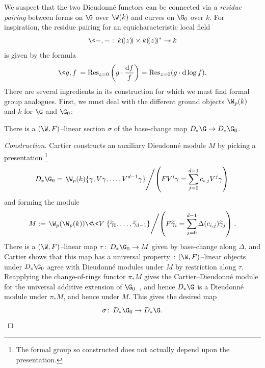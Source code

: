We suspect that the two Dieudonn\'e functors can be connected via a \textit{residue pairing} between forms on \(\G\) over \(\W(k)\) and curves on \(\G_0\) over \(k\).
For inspiration, the residue pairing for an equicharacteristic local field \[\<-,-\>\co k(\!(z)\!) \times k(\!(z)\!)^* \to k\] is given by the formula \[\<g, f\> = \operatorname{Res}_{z=0}\left(g \cdot \frac{\mathrm df}{f}\right) = \operatorname{Res}_{z=0}(g \cdot \mathrm d\log f).\]
There are several ingredients in its construction for which we must find formal group analogues.
First, we must deal with the different ground objects \(\W_p(k)\) and \(k\) for \(\G\) and \(\G_0\):
\begin{lemma}
There is a \((\W, F)\)--linear section \(\sigma\) of the base-change map \(D_* \G \to D_* \G_0\).
\end{lemma}
\begin{proof}[Construction]
Cartier constructs an auxiliary Dieudonn\'e module \(M\) by picking a presentation%
\footnote{%
The formal group so constructed does not actually depend upon the presentation.
}
\[D_* \G_0 = \left.\W_p(k)\{\gamma, V\gamma, \ldots, V^{d-1} \gamma\} \middle/ \left(F V^i \gamma = \sum_{j=0}^{d-1} c_{i,j} V^j \gamma\right) \right.\] and forming the module \[M := \left.\W_p(\W_p(k))\<\!\<V\>\!\>\{\widetilde\gamma_0, \ldots, \widetilde\gamma_{d-1}\} \middle/ \left(F \widetilde \gamma_i = \sum_{j=0}^{d-1} \Delta(c_{i,j}) \widetilde\gamma_j\right) \right. .\]
There is a \((\W, F)\)--linear map \(\tau\co D_* \G_0 \to M\) given by base-change along \(\Delta\), and Cartier shows that this map has a universal property~\cite[VII.2.9]{LazardCFGs}: \((\W, F)\)--linear objects under \(D_* \G_0\) agree with Dieudonn\'e modules under \(M\) by restriction along \(\tau\).
Reapplying the change-of-rings functor \(\pi_* M\) gives the Cartier--Dieudonn\'e module for the universal additive extension of \(\G_0\)~\cite[V.6.22 and VII.2.28]{LazardCFGs}, and hence \(D_* \G\) is a Dieudonn\'e module under \(\pi_* M\), and hence under \(M\).
This gives the desired map \[\sigma\co D_* \G_0 \to D_* \G. \qedhere\]
\end{proof}


